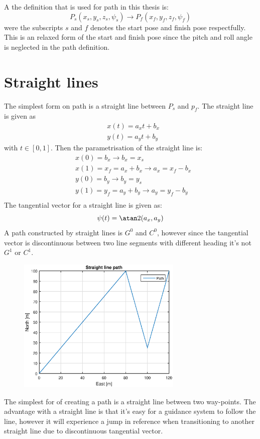 A the definition that is used for path in this thesis is:
\begin{equation}
P_s(x_s,y_s,z_s,\psi_s) \rightarrow P_f(x_f,y_f,z_f,\psi_f)
\end{equation}
were the subscripts $s$ and $f$ denotes the start pose and finish pose respectfully. This is an relaxed form of the start and finish pose since the pitch and roll angle is neglected in the path definition.

\section{Straight lines}
The simplest form on path is a straight line between $P_s$ and $p_f$. The straight line is given as 
\begin{subequations}
\begin{align}
& x(t) = a_xt + b_x \\
& y(t) = a_yt + b_y 
\end{align}
\end{subequations}
with $ t \in [0,1] $. Then the parametrisation of the straight line is:
\begin{subequations}
\begin{align}
& x(0) = b_x \rightarrow b_x = x_s \\
& x(1) = x_f = a_x + b_x \rightarrow a_x = x_f - b_x \\
& y(0) = b_y \rightarrow b_y = y_s \\
& y(1) = y_f = a_y + b_y \rightarrow a_y = y_f - b_y \\
\end{align}
\end{subequations}
The tangential vector for a straight line is given as:
\begin{equation}
\psi(t) = \atan2(a_x,a_y)
\end{equation}
A path constructed by straight lines is $G^0$ and $C^0$, however since the tangential vector is discontinuous between two line segments with different heading it's not $G^1$ or $C^1$.
\begin{figure}[H]
\includegraphics[width=0.7\textwidth]{figs/TheoryPlot/StraightLine.eps}
\end{figure}
The simplest for of creating a path is a straight line between two way-points. The advantage with a straight line is that it's easy for a guidance system to follow the line, however it will experience a jump in reference when transitioning to another straight line due to discontinuous tangential vector.
